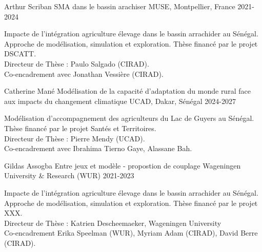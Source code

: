 \begin{cventries}
\cventry
  {Arthur Scriban} %
  {SMA dans le bassin arachiser} %
  {MUSE, Montpellier, France} %
  {2021-2024} %
  {
    \begin{cvitems} %
     Impacte de l'intégration agriculture élevage dans le bassin arrachider au Sénégal. Approche de modélisation, simulation et exploration. Thèse financé par le projet DSCATT.\\
     Directeur de Thèse : Paulo Salgado (CIRAD).\\
     Co-encadrement avec Jonathan Vessière (CIRAD).
    \end{cvitems}
  }
\end{cventries}

\vspace{2em}
\vspace{1em}
\begin{cventries}

    \cventry
      {Catherine Mané} %
      {Modélisation de la capacité d’adaptation du monde rural face
      aux impacts du changement climatique} %
      {UCAD, Dakar, Sénégal} %
      {2024-2027} %
      {
        \begin{cvitems} %
          Modélisation d'accompagnement des agriculteurs du Lac de Guyers au Sénégal. Thèse financé par le projet Santés et Territoires.\\
          Directeur de Thèse : Pierre Mendy (UCAD).\\
          Co-encadrement avec Ibrahima Tierno Gaye, Alassane Bah.
        \end{cvitems}
      }
    
    \cventry
      {Gildas Assogba} %
      {Entre jeux et modèle - propostion de couplage} %
      {Wageningen University \& Research (WUR)} %
      {2021-2023} %
      {
        \begin{cvitems} %
         Impacte de l'intégration agriculture élevage dans le bassin arrachider au Sénégal. Approche de modélisation, simulation et exploration. Thèse financé par le projet XXX.\\
         Directeur de Thèse : Katrien Descheemaeker, Wageningen University\\
         Co-encadrement Erika Speelman (WUR), Myriam Adam (CIRAD), David Berre (CIRAD).
        \end{cvitems}
      }  
\end{cventries}

